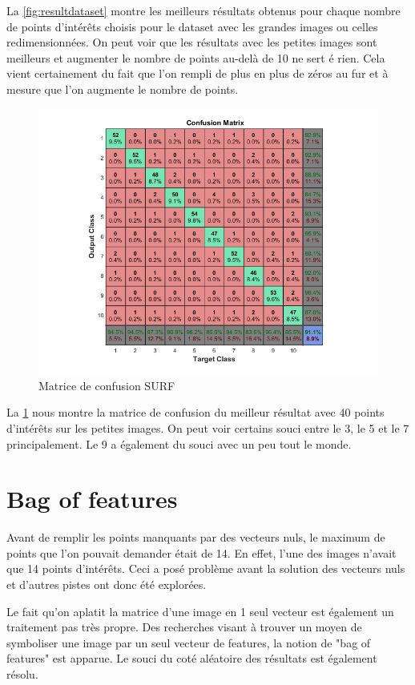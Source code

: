 La \ref{fig:resultdataset} montre les meilleurs résultats obtenus pour chaque nombre de points d'intérêts choisis pour le dataset avec les grandes images ou celles redimensionnées. On peut voir que les résultats avec les petites images sont meilleurs et augmenter le nombre de points au-delà de 10 ne sert é rien. Cela vient certainement du fait que l'on rempli de plus en plus de zéros au fur et à mesure que l'on augmente le nombre de points.

\begin{figure}[h]
\centering
\includegraphics[width=0.8\linewidth]{pictures/small_40_ann_surf.png}
\caption{Matrice de confusion SURF}
\label{fig:confusionmatrice1}
\end{figure}

La \ref{fig:confusionmatrice1} nous montre la matrice de confusion du meilleur résultat avec 40 points d'intérêts sur les petites images. On peut voir certains souci entre le 3, le 5 et le 7 principalement. Le 9 a également du souci avec un peu tout le monde.

\section{Bag of features}

Avant de remplir les points manquants par des vecteurs nuls, le maximum de points que l'on pouvait demander était de 14. En effet, l'une des images n'avait que 14 points d'intérêts. Ceci a posé problème avant la solution des vecteurs nuls et d'autres pistes ont donc été explorées.

Le fait qu'on aplatit la matrice d'une image en 1 seul vecteur est également un traitement pas très propre. Des recherches visant à trouver un moyen de symboliser une image par un seul vecteur de features, la notion de "bag of features" est apparue. Le souci du coté aléatoire des résultats est également résolu.

